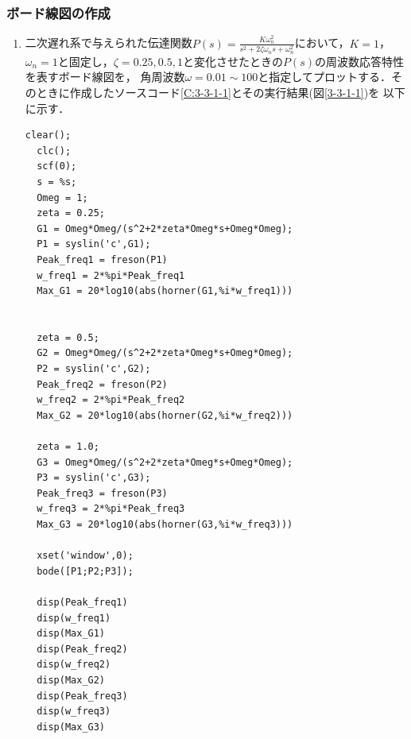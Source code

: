 \documentclass[a4paper,11pt]{jsarticle}
\begin{document}
\subsubsection{ボード線図の作成}
\begin{enumerate}
  \item
        二次遅れ系で与えられた伝達関数$P(s)=\frac{K\omega^2_n}{s^2+2\zeta\omega_ns+\omega^2_n}$において，$K=1$，
        $\omega_n=1$と固定し，$\zeta=0.25,0.5,1$と変化させたときの$P(s)$の周波数応答特性を表すボード線図を，
        角周波数$\omega=0.01 \sim 100$と指定してプロットする．そのときに作成したソースコード\ref{C:3-3-1-1}とその実行結果(図\ref{3-3-1-1})を
        以下に示す．
        \begin{lstlisting}[caption=C:3-3-1-1]
  clear();
  clc();
  scf(0);
  s = %s;
  Omeg = 1;
  zeta = 0.25;
  G1 = Omeg*Omeg/(s^2+2*zeta*Omeg*s+Omeg*Omeg);
  P1 = syslin('c',G1);
  Peak_freq1 = freson(P1)
  w_freq1 = 2*%pi*Peak_freq1
  Max_G1 = 20*log10(abs(horner(G1,%i*w_freq1)))


  zeta = 0.5;
  G2 = Omeg*Omeg/(s^2+2*zeta*Omeg*s+Omeg*Omeg);
  P2 = syslin('c',G2);
  Peak_freq2 = freson(P2)
  w_freq2 = 2*%pi*Peak_freq2
  Max_G2 = 20*log10(abs(horner(G2,%i*w_freq2)))

  zeta = 1.0;
  G3 = Omeg*Omeg/(s^2+2*zeta*Omeg*s+Omeg*Omeg);
  P3 = syslin('c',G3);
  Peak_freq3 = freson(P3)
  w_freq3 = 2*%pi*Peak_freq3
  Max_G3 = 20*log10(abs(horner(G3,%i*w_freq3)))

  xset('window',0);
  bode([P1;P2;P3]);

  disp(Peak_freq1)
  disp(w_freq1)
  disp(Max_G1)
  disp(Peak_freq2)
  disp(w_freq2)
  disp(Max_G2)
  disp(Peak_freq3)
  disp(w_freq3)
  disp(Max_G3)


\end{lstlisting}
\end{enumerate}
\end{document}
